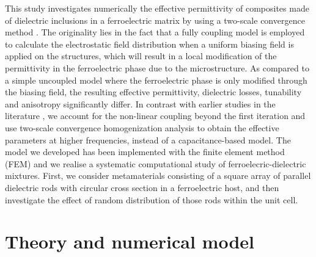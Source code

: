 \documentclass[%
 aip,
 amsmath,amssymb,
 reprint,%
linenumbers
]{revtex4-1}
\newcommand{\co}[1]{\textcolor{correction}{#1}}
\begin{document}
This study investigates \co{numerically} the effective permittivity of composites made of
 dielectric inclusions in a ferroelectric matrix
by using a two-scale convergence method \cite{allaire_homogenization_1992,
 guenneau_homogenization_2000}.
The originality lies in the fact that a fully coupling model is employed to
calculate the electrostatic field distribution when a uniform biasing field is
applied on the structures, which will result in a local modification of the permittivity
in the ferroelectric phase due to the microstructure. As compared to a simple uncoupled model where the
ferroelectric phase is only modified through the biasing field,
the resulting effective permittivity, dielectric losses, tunability and
anisotropy significantly differ. \co{In contrast with} earlier studies in the
\co{literature} \cite{padurariu_tailoring_2012,padurariu_field-dependent_2012}, we account for
the non-linear coupling beyond the first iteration and use two-scale
convergence homogenization analysis to obtain the effective parameters at
higher frequencies, instead of a capacitance-based model.
\co{The model we developed has been implemented with the finite element method (FEM)
and we realise a systematic computational study of ferroelecric-dielectric mixtures.
First, we consider} metamaterials consisting of a square array of parallel
dielectric rods with circular cross section in a ferroelectric host, and
then investigate the effect of random distribution of those rods within the unit cell.





\section{Theory and numerical model}
\end{document}

